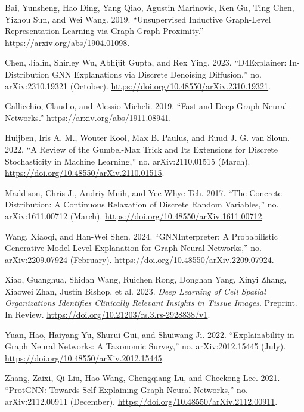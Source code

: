 \documentclass[
  11pt,
  letterpaper,
]{article}
\newlength{\cslhangindent}
\newlength{\cslentryspacingunit} %
\newenvironment{CSLReferences}[2] %
 {%
  \setlength{\parindent}{0pt}
  \ifodd #1
  \let\oldpar\par
  \def\par{\hangindent=\cslhangindent\oldpar}
  \fi
  \setlength{\parskip}{#2\cslentryspacingunit}
 }%
 {}
\begin{document}
\hypertarget{refs}{}
\begin{CSLReferences}{1}{0}
\leavevmode{}%
Bai, Yunsheng, Hao Ding, Yang Qiao, Agustin Marinovic, Ken Gu, Ting
Chen, Yizhou Sun, and Wei Wang. 2019. {``Unsupervised Inductive
Graph-Level Representation Learning via Graph-Graph Proximity.''}
\url{https://arxiv.org/abs/1904.01098}.

\leavevmode{}%
Chen, Jialin, Shirley Wu, Abhijit Gupta, and Rex Ying. 2023.
{``D4Explainer: In-Distribution GNN Explanations via Discrete Denoising
Diffusion,''} no. arXiv:2310.19321 (October).
\url{https://doi.org/10.48550/arXiv.2310.19321}.

\leavevmode{}%
Gallicchio, Claudio, and Alessio Micheli. 2019. {``Fast and Deep Graph
Neural Networks.''} \url{https://arxiv.org/abs/1911.08941}.

\leavevmode{}%
Huijben, Iris A. M., Wouter Kool, Max B. Paulus, and Ruud J. G. van
Sloun. 2022. {``A Review of the Gumbel-Max Trick and Its Extensions for
Discrete Stochasticity in Machine Learning,''} no. arXiv:2110.01515
(March). \url{https://doi.org/10.48550/arXiv.2110.01515}.

\leavevmode{}%
Maddison, Chris J., Andriy Mnih, and Yee Whye Teh. 2017. {``The Concrete
Distribution: A Continuous Relaxation of Discrete Random Variables,''}
no. arXiv:1611.00712 (March).
\url{https://doi.org/10.48550/arXiv.1611.00712}.

\leavevmode{}%
Wang, Xiaoqi, and Han-Wei Shen. 2024. {``GNNInterpreter: A Probabilistic
Generative Model-Level Explanation for Graph Neural Networks,''} no.
arXiv:2209.07924 (February).
\url{https://doi.org/10.48550/arXiv.2209.07924}.

\leavevmode{}%
Xiao, Guanghua, Shidan Wang, Ruichen Rong, Donghan Yang, Xinyi Zhang,
Xiaowei Zhan, Justin Bishop, et al. 2023. \emph{Deep Learning of Cell
Spatial Organizations Identifies Clinically Relevant Insights in Tissue
Images}. Preprint. In Review.
\url{https://doi.org/10.21203/rs.3.rs-2928838/v1}.

\leavevmode{}%
Yuan, Hao, Haiyang Yu, Shurui Gui, and Shuiwang Ji. 2022.
{``Explainability in Graph Neural Networks: A Taxonomic Survey,''} no.
arXiv:2012.15445 (July).
\url{https://doi.org/10.48550/arXiv.2012.15445}.

\leavevmode{}%
Zhang, Zaixi, Qi Liu, Hao Wang, Chengqiang Lu, and Cheekong Lee. 2021.
{``ProtGNN: Towards Self-Explaining Graph Neural Networks,''} no.
arXiv:2112.00911 (December).
\url{https://doi.org/10.48550/arXiv.2112.00911}.

\end{CSLReferences}
\end{document}
